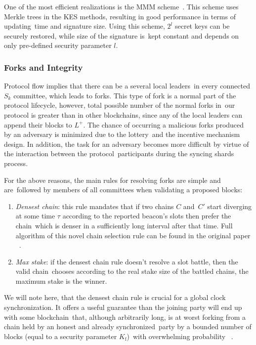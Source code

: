 One of the most efficient realizations is the MMM scheme~\cite{Malkin2002}.
This scheme uses Merkle trees in the KES methods, resulting in good performance in terms of updating\
time and signature size.
Using this scheme, $2^l$ secret keys can be securely restored, while size of the signature is\
kept constant and depends on only pre-defined security parameter $l$.

\subsubsection{Forks and Integrity}\label{subsubsec:resolving-forks}

Protocol flow implies that there can be a several local leaders\
in every connected $S_k$ committee, which leads to forks.
This type of fork is a normal part of the protocol lifecycle, however, total possible number of the normal forks in\
our protocol is greater than in other blockchains, since any of the local leaders can append their blocks to $L^+$.
The chance of occurring a malicious forks produced by an adversary is minimized due to the lottery\
and the incentive mechanism design.
In addition, the task for an adversary becomes more difficult by virtue of the interaction between the protocol\
participants during the syncing shards process.

For the above reasons, the main rules for resolving forks are simple and are\
followed by members of all committees when validating a proposed blocks:
\begin{enumerate}
    \item \textit{Densest chain}: this rule mandates that if two chains $C$ and\
    $C'$ start diverging at some time $\tau$ according to the reported beacon's slots then prefer the chain\
    which is denser in a sufficiently long interval after that time.
    Full algorithm of this novel chain selection rule can be found in the original paper ~\cite{Badertscher2018}.
    \item \textit{Max stake}: if the densest chain rule doesn't resolve a slot battle, then the valid chain\
    chooses according to the real stake size of the battled chains, the maximum stake is the winner.
\end{enumerate}
We will note here, that the densest chain rule is crucial for a global clock synchronization.
It offers a useful guarantee than the joining party will end up with some blockchain\
that, although arbitrarily long, is at worst forking from a chain held by an honest and already synchronized\
party by a bounded number of blocks (equal to a security parameter $K_{\text{f}}$)\
with overwhelming probability ~\cite{cryptoeprint:2019/838}.

